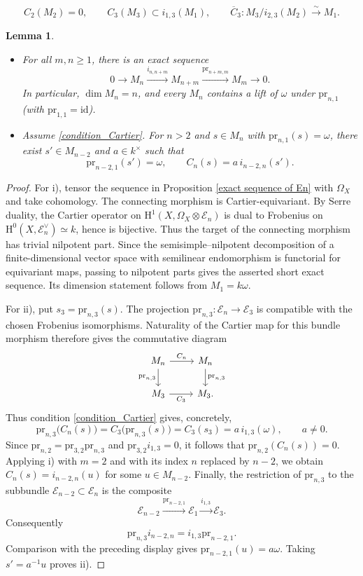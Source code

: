 \documentclass[10pt,a4paper]{amsart}
\newtheorem{lem}{Lemma}
\begin{document}
\begin{equation*}\tag{C}\label{condition_Cartier}
C_2(M_2)=0,\qquad C_3(M_3)\subset i_{1,3}(M_1),\qquad
\overline C_3:M_3/i_{2,3}(M_2)\xrightarrow{\sim}M_1.
\end{equation*}

\begin{lem}\label{lemma 5.13}\leavevmode
\begin{itemize}
\item[i)] For all $m,n\geq1$, there is an exact sequence
\[
0\longrightarrow M_n\xrightarrow{i_{n,n+m}}M_{n+m}
\xrightarrow{\mathrm{pr}_{n+m,m}}M_m\longrightarrow0.
\]
In particular, $\dim M_n=n$, and every $M_n$ contains a lift of $\omega$
under $\mathrm{pr}_{n,1}$ (with $\mathrm{pr}_{1,1}=\mathrm{id}$).
\item[ii)] Assume \eqref{condition_Cartier}. For $n>2$ and
$s\in M_n$ with $\mathrm{pr}_{n,1}(s)=\omega$, there exist
$s'\in M_{n-2}$ and $a\in k^\times$ such that
\[
\mathrm{pr}_{n-2,1}(s')=\omega,
\qquad C_n(s)=a\,i_{n-2,n}(s').
\]
\end{itemize}
\end{lem}

\begin{proof}
For i), tensor the sequence in Proposition \ref{exact sequence of En}
with $\Omega_X$ and take cohomology. The connecting morphism is
Cartier-equivariant. By Serre duality, the Cartier operator on
$\mathrm H^1(X,\Omega_X\otimes\mathcal E_n)$ is dual to Frobenius on
$\mathrm H^0(X,\mathcal E_n^\vee)\simeq k$, hence is bijective. Thus the
target of the connecting morphism has trivial nilpotent part. Since the
semisimple--nilpotent decomposition of a finite-dimensional vector space
with semilinear endomorphism is functorial for equivariant maps, passing to
nilpotent parts gives the asserted short exact sequence. Its dimension
statement follows from $M_1=k\omega$.

For ii), put $s_3=\mathrm{pr}_{n,3}(s)$. The projection
$\mathrm{pr}_{n,3}:\mathcal E_n\to\mathcal E_3$ is compatible with the
chosen Frobenius isomorphisms. Naturality of the Cartier map for this
bundle morphism therefore gives the commutative diagram
\[
\begin{tikzcd}
M_n \arrow[r,"C_n"] \arrow[d,"\mathrm{pr}_{n,3}"']
& M_n \arrow[d,"\mathrm{pr}_{n,3}"]\\
M_3 \arrow[r,"C_3"'] & M_3.
\end{tikzcd}
\]
Thus condition \eqref{condition_Cartier} gives, concretely,
\[
\mathrm{pr}_{n,3}\bigl(C_n(s)\bigr)
=C_3\bigl(\mathrm{pr}_{n,3}(s)\bigr)
=C_3(s_3)=a\,i_{1,3}(\omega),\qquad a\ne0.
\]
Since $\mathrm{pr}_{n,2}=\mathrm{pr}_{3,2}\mathrm{pr}_{n,3}$ and
$\mathrm{pr}_{3,2}i_{1,3}=0$, it follows that
$\mathrm{pr}_{n,2}(C_n(s))=0$. Applying i) with $m=2$ and with its
index $n$ replaced by $n-2$, we obtain
$C_n(s)=i_{n-2,n}(u)$ for some $u\in M_{n-2}$.
Finally, the restriction of $\mathrm{pr}_{n,3}$ to the subbundle
$\mathcal E_{n-2}\subset\mathcal E_n$ is the composite
\[
\mathcal E_{n-2}\xrightarrow{\mathrm{pr}_{n-2,1}}\mathcal E_1
\xrightarrow{i_{1,3}}\mathcal E_3.
\]
Consequently
\[
\mathrm{pr}_{n,3}i_{n-2,n}
=i_{1,3}\mathrm{pr}_{n-2,1}.
\]
Comparison with the preceding display gives
$\mathrm{pr}_{n-2,1}(u)=a\omega$.
Taking $s'=a^{-1}u$ proves ii).
\end{proof}
\end{document}
